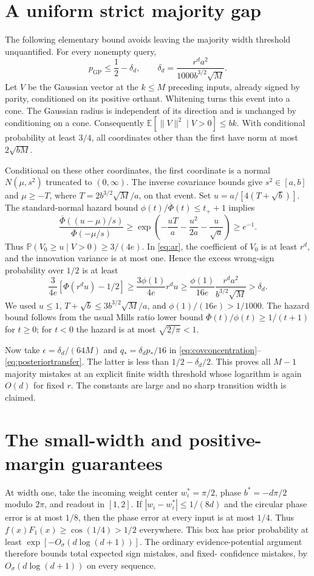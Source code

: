 \documentclass[11pt]{article}
\newcommand{\E}{\mathbb E}
\newcommand{\Pp}{\mathbb P}
\begin{document}
\section{A uniform strict majority gap}
The following elementary bound avoids leaving the majority width
threshold unquantified. For every nonempty query,
\begin{equation}\label{eq:gap}
 p_{\mathrm{GP}}\le\frac12-\delta_d,
 \qquad\delta_d=\frac{r^d a^2}{1000b^{3/2}\sqrt M}.
\end{equation}
Let $V$ be the Gaussian vector at the $k\le M$ preceding inputs,
already signed by parity, conditioned on its positive orthant. Whitening
turns this event into a cone. The Gaussian radius is independent of its
direction and is unchanged by conditioning on a cone. Consequently
$\E[\|V\|^2\mid V>0]\le bk$. With conditional probability at least
$3/4$, all coordinates other than the first have norm at most
$2\sqrt{bM}$.

Conditional on these other coordinates, the first coordinate is a normal
$N(\mu,s^2)$ truncated to $(0,\infty)$. The inverse covariance bounds
give $s^2\in[a,b]$ and
$\mu\ge-T$, where $T=2b^{3/2}\sqrt M/a$, on that event. Set
$u=a/[4(T+\sqrt b)]$. The standard-normal hazard bound
$\phi(t)/\overline\Phi(t)\le t_++1$ implies
\[
 \frac{\overline\Phi((u-\mu)/s)}{\overline\Phi(-\mu/s)}
 \ge\exp\left(-\frac{uT}{a}-\frac{u^2}{2a}-\frac{u}{\sqrt a}\right)
 \ge e^{-1}.
\]
Thus $\Pp(V_0\ge u\mid V>0)\ge3/(4e)$. In \eqref{eq:ar}, the
coefficient of $V_0$ is at least $r^d$, and the innovation variance is
at most one. Hence the excess wrong-sign probability over $1/2$ is
at least
\[
 \frac{3}{4e}[\Phi(r^du)-1/2]
 \ge\frac{3\phi(1)}{4e}r^du
 \ge\frac{\phi(1)}{16e}
           \frac{r^da^2}{b^{3/2}\sqrt M}>\delta_d.
\]
We used $u\le1$, $T+\sqrt b\le3b^{3/2}\sqrt M/a$, and
$\phi(1)/(16e)>1/1000$. The hazard bound follows from the usual Mills
ratio lower bound $\overline\Phi(t)/\phi(t)\ge1/(t+1)$ for $t\ge0$;
for $t<0$ the hazard is at most $\sqrt{2/\pi}<1$.

Now take $\epsilon=\delta_d/(64M)$ and $q_*=\delta_dp_*/16$ in
\eqref{eq:covconcentration}--\eqref{eq:posteriortransfer}. The latter
is less than $1/2-\delta_d/2$. This proves all $M-1$ majority mistakes
at an explicit finite width threshold whose logarithm is again $O(d)$
for fixed $r$. The constants are large and no sharp transition width
is claimed.

\section{The small-width and positive-margin guarantees}
At width one, take the incoming weight center $w_i^*=\pi/2$, phase
$b^*=-d\pi/2$ modulo $2\pi$, and readout in $[1,2]$. If
$|w_i-w_i^*|\le1/(8d)$ and the circular phase error is at most $1/8$,
then the phase error at every input is at most $1/4$. Thus
$f(x)F_1(x)\ge\cos(1/4)>1/2$ everywhere. This box has prior probability
at least $\exp[-O_\sigma(d\log(d+1))]$. The ordinary evidence-potential
argument therefore bounds total expected sign mistakes, and fixed-
confidence mistakes, by $O_\sigma(d\log(d+1))$ on every sequence.
\end{document}
